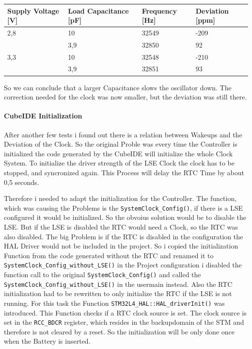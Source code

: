 \begin{tabular}{|l|l|l|l|}
\hline
Supply Voltage {[}V{]} & Load Capacitance {[}pF{]} & Frequency {[}Hz{]} & Deviation {[}ppm{]} \\ \hline
2,8   & 10                        & 32549              & -209                \\ \cline{2-4} 
                       & 3,9                       & 32850              & 92                  \\ \hline
3,3   & 10                        & 32548              & -210                \\ \cline{2-4} 
                       & 3,9                       & 32851              & 93                  \\ \hline
\end{tabular}
\vspace{1cm}

So we can conclude that a larger Capacitance slows the oscillator down. The correction needed for the clock was now smaller, but the deviation was still there.

\paragraph{CubeIDE Initialization}
After another few tests i found out there is a relation between Wakeups and the Deviation of the Clock. So the original Proble was every time the Controller is initialized the code generated by the CubeIDE will initialize the whole Clock System. To initialize the driver strength of the LSE Clock the clock has to be stopped, and syncronized again. This Process will delay the RTC Time by about 0,5 seconds.

Therefore i needed to adapt the initialization for the Controller. The function, which was causing the Problems is the \verb!SystemClock_Config()!, if there is a LSE configured it would be initialized. So the obvoius solution would be to disable the LSE. But if the LSE is disabled the RTC would need a Clock, so the RTC was also disabled. The big Problem is if the RTC is disabled in the configuration the HAL Driver would not be included in the project. So i copied the initialization Function from the code generated without the RTC and renamed it to \verb!SystemClock_Config_without_LSE()! in the Project configuration i disabled the function call to the original \verb!SystemClock_Config()! and called the \verb!SystemClock_Config_without_LSE()! in the usermain instead. Also the RTC initialization had to be rewritten to only initialize the RTC if the LSE is not running. For this task the Function \verb!STM32L4_HAL::HAL_driverInit()! was introduced. This Function checks if a RTC clock source is set. The clock source is set in the \verb!RCC_BDCR! register, which resides in the backupdomain of the STM and therefore is not cleared by a reset. So the initialization will be only done once when the Battery is inserted.
